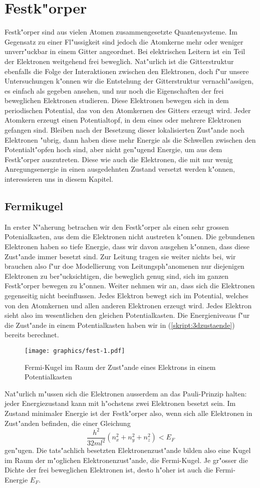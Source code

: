 \chapter{Festk"orper\label{chapter:festkoerper}}
\rhead{}
Festk"orper sind aus vielen Atomen zusammengesetzte Quantensysteme.
Im Gegensatz zu einer Fl"ussigkeit sind jedoch die Atomkerne mehr
oder weniger unverr"uckbar in einem Gitter angeordnet.
Bei elektrischen Leitern ist ein Teil der Elektronen weitgehend frei
beweglich.
Nat"urlich ist die Gitterstruktur ebenfalls die Folge der Interaktionen
zwischen den Elektronen, doch f"ur unsere Untersuchungen k"onnen wir
die Entstehung der Gitterstruktur vernachl"assigen, es einfach als
gegeben ansehen, und nur noch die Eigenschaften der frei beweglichen
Elektronen studieren.
Diese Elektronen bewegen sich in dem periodischen Potential, das von
den Atomkernen des Gitters erzeugt wird.
Jeder Atomkern erzeugt einen Potentialtopf, in dem eines oder mehrere
Elektronen gefangen sind.
Bleiben nach der Besetzung dieser lokalisierten Zust"ande noch
Elektronen "ubrig, dann haben diese mehr Energie als die Schwellen zwischen
den Potentialt"opfen hoch sind, aber nicht gen"ugend Energie, um
aus dem Festk"orper auszutreten.
Diese wie auch die Elektronen, die mit nur wenig Anregungsenergie
in einen ausgedehnten Zustand versetzt werden k"onnen, interessieren
uns in diesem Kapitel.

\section{Fermikugel}
In erster N"aherung betrachen wir den Festk"orper als einen
sehr grossen Potenialkasten, aus dem die Elektronen nicht austreten
k"onnen.
Die gebundenen Elektronen haben so tiefe Energie, dass wir davon
ausgehen k"onnen, dass diese Zust"ande immer besetzt sind.
Zur Leitung tragen sie weiter nichts bei, wir brauchen also f"ur
doe Modellierung von Leitungsph"anomenen nur diejenigen Elektronen
zu ber"ucksichtigen, die beweglich genug sind, sich im ganzen
Festk"orper bewegen zu k"onnen.
Weiter nehmen wir an, dass sich die Elektronen gegenseitig 
nicht beeinflussen.
Jedes Elektron bewegt sich im Potential, welches von den Atomkernen
und allen anderen Elektronen erzeugt wird.
Jedes Elektron sieht also im wesentlichen den gleichen Potentialkasten.
Die Energieniveaus f"ur die Zust"ande in einem Potentialkasten haben
wir in (\ref{skript:3dzustaende}) bereits berechnet.
\begin{figure}
\centering
\texttt{[image: graphics/fest-1.pdf]}
\caption{Fermi-Kugel im Raum der Zust"ande eines Elektrons in einem
Potentialkasten
\label{skript:fermi-kugel}}
\end{figure}
Nat"urlich m"ussen sich die Elektronen ausserdem an das Pauli-Prinzip
halten: jeder Energiezustand kann mit h"ochstens zwei Elektronen
besetzt sein. 
Im Zustand minimaler Energie ist der Festk"orper also, wenn sich
alle Elektronen in Zust"anden befinden, die einer Gleichung
\[
\frac{h^2}{32ml^2}(
n_x^2
+
n_y^2
+
n_z^2
)
<
E_F
\]
gen"ugen.
Die tats"achlich besetzten Elektronenzust"ande bilden also eine Kugel
im Raum der m"oglichen Elektronenzust"ande, die Fermi-Kugel.
Je gr"osser die Dichte der frei beweglichen Elektronen ist, desto
h"oher ist auch die Fermi-Energie $E_F$.

